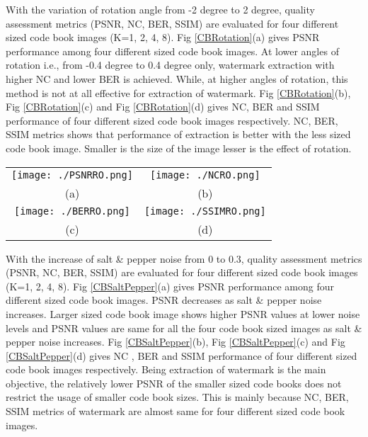 With the variation of rotation angle from -2 degree to 2 degree, quality assessment metrics (PSNR, NC, BER, SSIM) are evaluated for four different sized code book images (K=1, 2, 4, 8). Fig \ref{CBRotation}(a) gives PSNR performance among four different sized code book images. At lower angles of rotation i.e., from -0.4 degree to 0.4 degree only, watermark extraction with higher NC and lower BER is achieved. While, at higher angles of rotation, this method is not at all effective for extraction of watermark. Fig \ref{CBRotation}(b), Fig \ref{CBRotation}(c) and Fig \ref{CBRotation}(d) gives NC, BER and SSIM performance of four different sized code book images respectively. NC, BER, SSIM metrics shows that performance of extraction is better with the less sized code book image. Smaller is the size of the image lesser is the effect of rotation. \\

\begin{figure*}

\begin{tabular}{cc}
\texttt{[image: ./PSNRRO.png]}&\texttt{[image: ./NCRO.png]}\\
(a)  & (b) \\
\texttt{[image: ./BERRO.png]}&\texttt{[image: ./SSIMRO.png]}\\
(c)   & (d)
\end{tabular}
\caption{(a) PSNR Vs Angle, (b) NC Vs Angle,  (c) BER Vs Angle,  (d) SSIM Vs Angle }
\label{CBRotation}
\end{figure*}


With the increase of salt \& pepper noise from 0 to 0.3, quality assessment metrics (PSNR, NC, BER, SSIM) are evaluated for four different sized code book images (K=1, 2, 4, 8). Fig \ref{CBSaltPepper}(a) gives PSNR performance among four different sized code book images. PSNR decreases as salt \& pepper noise increases. Larger sized code book image shows higher PSNR values at lower noise levels and PSNR values are same for all the four code book sized images as salt \& pepper noise increases. Fig \ref{CBSaltPepper}(b), Fig \ref{CBSaltPepper}(c) and Fig \ref{CBSaltPepper}(d) gives NC , BER and SSIM performance of four different sized code book images respectively. Being extraction of watermark is the main objective, the relatively lower PSNR of the smaller sized code books does not restrict the usage of smaller code book sizes. This is mainly because NC, BER, SSIM metrics of watermark are almost same for four different sized code book images.

